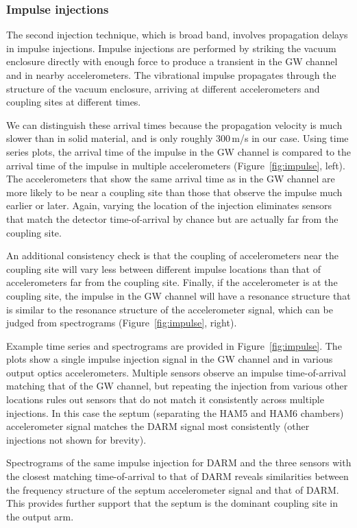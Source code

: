 \subsubsection{Impulse injections}

The second injection technique, which is broad band, involves propagation delays in impulse injections.
Impulse injections are performed by striking the vacuum enclosure directly with enough force to produce a transient in the \ac{GW} channel and in nearby accelerometers.
The vibrational impulse propagates through the structure of the vacuum enclosure, arriving at different accelerometers and coupling sites at different times.

We can distinguish these arrival times because the propagation velocity is much slower than in solid material, and is only roughly 300\,m/s in our case. Using time series plots, the arrival time of the impulse in the \ac{GW} channel is compared to the arrival time of the impulse in multiple accelerometers (Figure~\ref{fig:impulse}, left).
The accelerometers that show the same arrival time as in the \ac{GW} channel are more likely to be near a coupling site than those that observe the impulse much earlier or later.
Again, varying the location of the injection eliminates sensors that match the detector time-of-arrival by chance but are actually far from the coupling site.

An additional consistency check is that the coupling of accelerometers near the coupling site will vary less between different impulse locations than that of accelerometers far from the coupling site.
Finally, if the accelerometer is at the coupling site, the impulse in the \ac{GW} channel will have a resonance structure that is similar to the resonance structure of the accelerometer signal, which can be judged from spectrograms (Figure~\ref{fig:impulse}, right).

Example time series and spectrograms are provided in Figure~\ref{fig:impulse}.
The plots show a single impulse injection signal in the \ac{GW} channel and in various output optics accelerometers.
Multiple sensors observe an impulse time-of-arrival matching that of the \ac{GW} channel, but repeating the injection from various other locations rules out sensors that do not match it consistently across multiple injections.
In this case the septum (separating the HAM5 and HAM6 chambers) accelerometer signal matches the \ac{DARM} signal most consistently (other injections not shown for brevity).

Spectrograms of the same impulse injection for \ac{DARM} and the three sensors with the closest matching time-of-arrival to that of \ac{DARM} reveals similarities between the frequency structure of the septum accelerometer signal and that of \ac{DARM}.
This provides further support that the septum is the dominant coupling site in the output arm.

